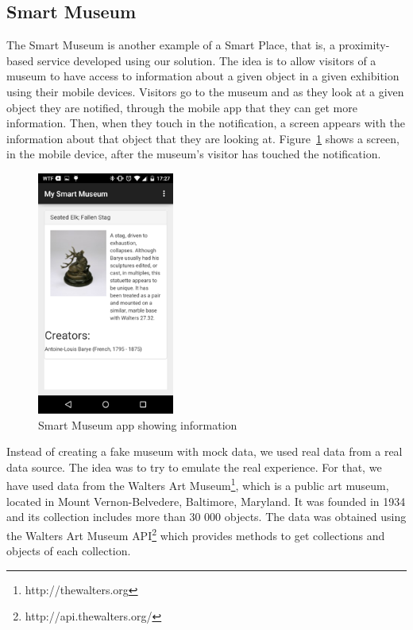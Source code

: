 \subsection{Smart Museum}
\label{sub:smart_museum}
The Smart Museum is another example of a Smart Place, that is, a proximity-based service developed using our solution.
The idea is to allow visitors of a museum to have access to information about a given object in a given exhibition using their mobile devices.
Visitors go to the museum and as they look at a given object they are notified, through the mobile app that they can get more information.
Then, when they touch in the notification, a screen appears with the information about that object that they are looking at.
Figure~\ref{fig:smart_museum_app} shows a screen, in the mobile device, after the museum's visitor has touched the notification.

\begin{figure}[!ht]
  \centering
    \includegraphics[width=0.4\textwidth, keepaspectratio]{images/screenshots/smart_museum_app}
    \caption[Smart Museum]{Smart Museum app showing information}
    \label{fig:smart_museum_app}
\end{figure}

Instead of creating a fake museum with mock data, we used real data from a real data source.
The idea was to try to emulate the real experience.
For that, we have used data from the Walters Art Museum\footnote{http://thewalters.org}, which is a public art museum, located in Mount Vernon-Belvedere, Baltimore, Maryland.
It was founded in 1934 and its collection includes more than 30 000 objects.
The data was obtained using the Walters Art Museum \gls{API}\footnote{http://api.thewalters.org/} which provides methods to get collections and objects of each collection.

